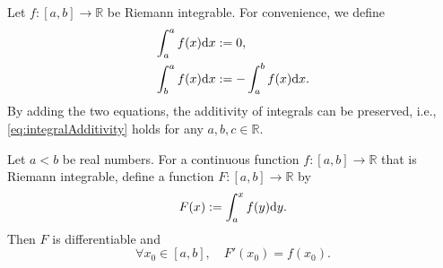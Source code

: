 \begin{ntn}
  \label{ntn:rulesOfRangeOfIntegration}
  Let $f:[a,b]\rightarrow \mathbb{R}$ be Riemann integrable.
  For convenience, we define
  \begin{align*}
    \int_{a}^{a}f(x)\mathrm{d} x&:=0,\\
    \int_{b}^{a}f(x)\mathrm{d} x&:=-\int_{a}^{b}f(x)\mathrm{d} x.
  \end{align*}
  By adding the two equations, the additivity of integrals can be
  preserved, i.e., \eqref{eq:integralAdditivity} holds for any
  $a,b,c\in \mathbb{R}$.
\end{ntn}

\begin{thm}
  \label{thm:fundamentalThmCalculus1}
  Let $a<b$ be real numbers.
  For a continuous function $f: [a,b]\rightarrow \mathbb{R}$
  that is Riemann integrable, 
  define a function $F: [a,b]\rightarrow \mathbb{R}$ by
  \begin{equation}
    \label{eq:integralOfRiemannIntF}
    F(x) := \int_a^x f(y) \mathrm{d} y.
  \end{equation}
  Then $F$ is differentiable and
  \begin{equation}
    \label{eq:fundamentalThmCalculus1}
    \forall x_0\in [a,b], \quad
    F'(x_0) = f(x_0).
  \end{equation}
\end{thm}

